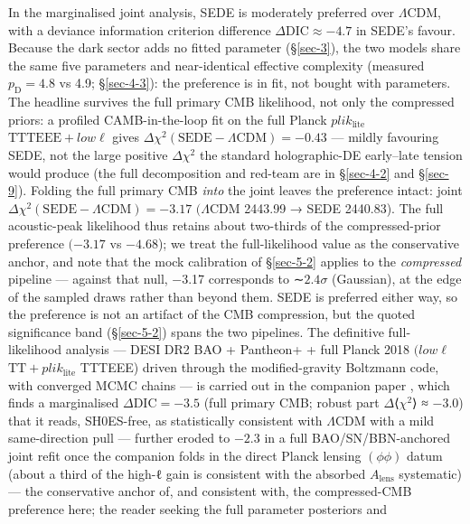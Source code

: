 \documentclass[preprint,12pt]{elsarticle}
\begin{document}
In the marginalised joint analysis, SEDE is moderately preferred over
\(\Lambda \mathrm{CDM}\), with a deviance information criterion
difference \(\Delta \mathrm{DIC} \approx  -4.7\) in SEDE's favour.
Because the dark sector adds no fitted parameter (§\ref{sec-3}), the two
models share the same five parameters and near-identical effective
complexity (measured \(p_{\mathrm{D}} = 4.8\) vs 4.9; §\ref{sec-4-3}):
the preference is in fit, not bought with parameters. The headline
survives the full primary CMB likelihood, not only the compressed
priors: a profiled CAMB-in-the-loop fit on the full Planck
\(plik_{\mathrm{lite}}\) \(\mathrm{TTTEEE} + low\ell\) gives
\(\Delta \chi ^{2}(\mathrm{SEDE}-\Lambda \mathrm{CDM}) = -0.43\) ---
mildly favouring SEDE, not the large positive \(\Delta \chi ^{2}\) the
standard holographic-DE early--late tension would produce (the full
decomposition and red-team are in §\ref{sec-4-2} and §\ref{sec-9}).
Folding the full primary CMB \emph{into} the joint leaves the preference
intact: joint
\(\Delta \chi ^{2}(\mathrm{SEDE}-\Lambda \mathrm{CDM}) = -3.17\)
\((\Lambda \mathrm{CDM}\) 2443.99 → SEDE 2440.83). The full
acoustic-peak likelihood thus retains about two-thirds of the
compressed-prior preference \((-3.17\) vs \(-4.68\)); we treat the
full-likelihood value as the conservative anchor, and note that the mock
calibration of §\ref{sec-5-2} applies to the \emph{compressed} pipeline
--- against that null, −3.17 corresponds to ∼\(2.4\sigma\) (Gaussian),
at the edge of the sampled draws rather than beyond them. SEDE is
preferred either way, so the preference is not an artifact of the CMB
compression, but the quoted significance band (§\ref{sec-5-2}) spans the
two pipelines. The definitive full-likelihood analysis --- DESI DR2 BAO
+ Pantheon+ + full Planck 2018 \((low\ell\)
\(\mathrm{TT} + plik_{\mathrm{lite}}\) TTTEEE) driven through the
modified-gravity Boltzmann code, with converged MCMC chains --- is
carried out in the companion paper \citep{Pandev:2026obstest}, which
finds a marginalised \(\Delta \mathrm{DIC} = -3.5\) (full primary CMB;
robust part \(\Delta\)⟨\(\chi ^{2}\)⟩ ≈ −3.0) that it reads, SH0ES-free,
as statistically consistent with \(\Lambda \mathrm{CDM}\) with a mild
same-direction pull --- further eroded to \(-2.3\) in a full
BAO/SN/BBN-anchored joint refit once the companion folds in the direct
Planck lensing \((\phi \phi )\) datum (about a third of the high-ℓ gain
is consistent with the absorbed \(A_{\mathrm{lens}}\) systematic) ---
the conservative anchor of, and consistent with, the compressed-CMB
preference here; the reader seeking the full parameter posteriors and
\end{document}
